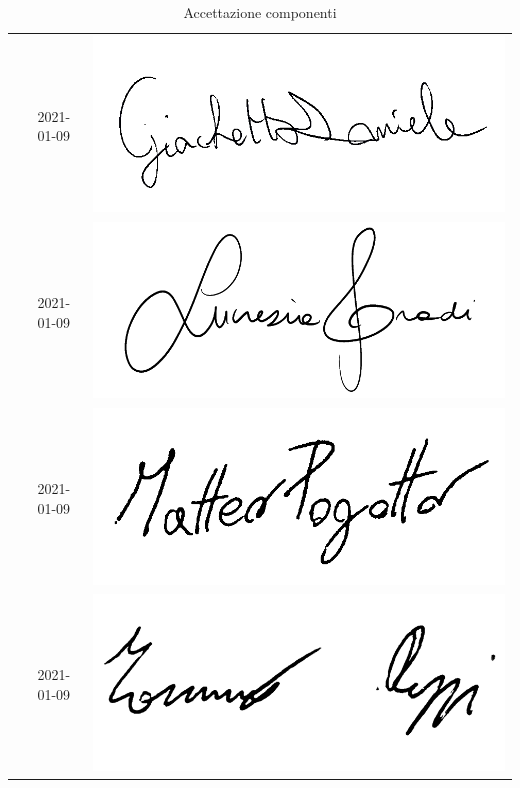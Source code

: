 \begin{table}[H]
\begin{center}
\begin{tabular}{ c c c}
				\Daniele{} & 2021-01-09 & \includegraphics[scale = 0.16]{components/img/firme_membri/firma-dg.png} \\
				\Lucrezia{} & 2021-01-09 & \includegraphics[scale = 0.5]{components/img/firme_membri/firma-lg.png} \\
				\Matteo{} & 2021-01-09 & \includegraphics[scale = 0.12]{components/img/firme_membri/firma-mp.png} \\
				\Tommaso{} & 2021-01-09 & \includegraphics[scale = 0.5]{components/img/firme_membri/firma-tp.png} \\
				
				\bottomrule
			\end{tabular}
			\caption{Accettazione componenti}
		\end{center}
    \end{table}

